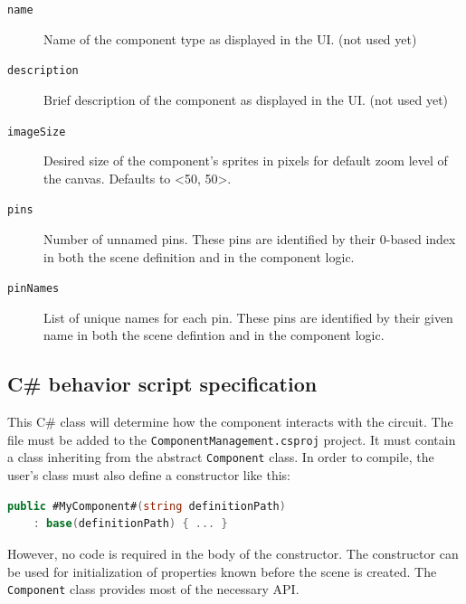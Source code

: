 \begin{description}
    \item[\texttt{name}] Name of the component type as displayed in the UI. (not used yet)
    \item[\texttt{description}] Brief description of the component as displayed in the UI. (not used yet)
    \item[\texttt{imageSize}] Desired size of the component's sprites in pixels for default zoom level of the canvas. Defaults to <50, 50>.
    \item[\texttt{pins}] Number of unnamed pins. These pins are identified by their 0-based index in both the scene definition and in the component logic.
    \item[\texttt{pinNames}] List of unique names for each pin. These pins are identified by their given name in both the scene defintion and in the component logic.
\end{description}

\subsection{C\# behavior script specification}
This C\# class will determine how the component interacts with the circuit. The file must be added to the \texttt{ComponentManagement.csproj} project. It must contain a class inheriting from the abstract \texttt{Component} class. In order to compile, the user's class must also define a constructor like this:

\begin{lstlisting}[language=csharp]
    public #MyComponent#(string definitionPath) 
    : base(definitionPath) { ... }
\end{lstlisting}

However, no code is required in the body of the constructor. The constructor can be used for initialization of properties known before the scene is created. The \texttt{Component} class provides most of the necessary API.

